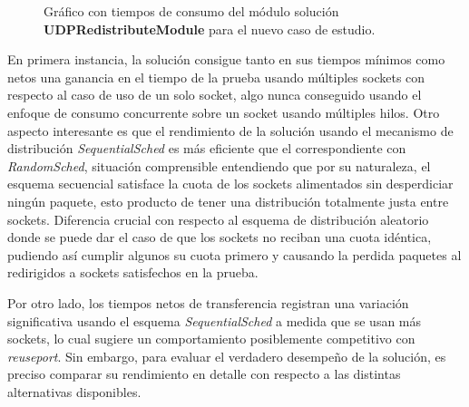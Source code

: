 \begin{figure}[h!]
	\centering
	\hspace*{\fill}
	\hfill
	\caption{Gráfico con tiempos de consumo del módulo solución \textbf{UDPRedistributeModule} para el nuevo caso de estudio.}
	\label{fig:resultadoMiModuloMinMax}
	\hspace*{\fill}
\end{figure}

En primera instancia, la solución consigue tanto en sus tiempos mínimos como netos una ganancia en el tiempo de la prueba usando múltiples sockets con respecto al caso de uso de un solo socket, algo nunca conseguido usando el enfoque de consumo concurrente sobre un socket usando múltiples hilos. Otro aspecto interesante es que el rendimiento de la solución usando el mecanismo de distribución \emph{SequentialSched} es más eficiente que el correspondiente con \emph{RandomSched}, situación comprensible entendiendo que por su naturaleza, el esquema secuencial satisface la cuota de los sockets alimentados sin desperdiciar ningún paquete, esto producto de tener una distribución totalmente justa entre sockets. Diferencia crucial con respecto al esquema de distribución aleatorio donde se puede dar el caso de que los sockets no reciban una cuota idéntica, pudiendo así cumplir algunos su cuota primero y causando la perdida paquetes al redirigidos a sockets satisfechos en la prueba.

Por otro lado, los tiempos netos de transferencia registran una variación significativa usando el esquema \emph{SequentialSched} a medida que se usan más sockets, lo cual sugiere un comportamiento posiblemente competitivo con \emph{reuseport}. Sin embargo, para evaluar el verdadero desempeño de la solución, es preciso comparar su rendimiento en detalle con respecto a las distintas alternativas disponibles.

